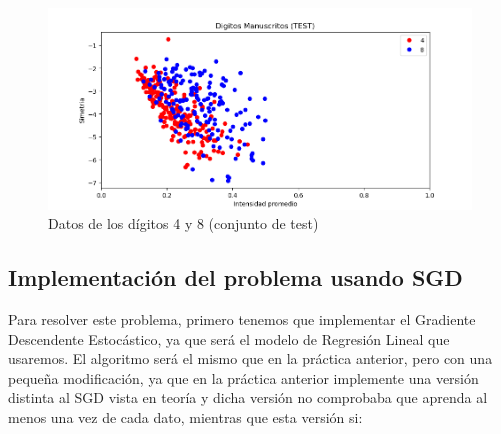 \documentclass[12pt, spanish]{article}
\begin{document}
\begin{figure}[H]
  \centering
      \includegraphics[scale = 0.70]{datos_bonus_test.png}
 		 \caption{Datos de los dígitos 4 y 8 (conjunto de test)}
  		\label{fig:bonus_test}

\end{figure}

\subsection{Implementación del problema usando SGD}

Para resolver este problema, primero tenemos que implementar el Gradiente Descendente Estocástico, ya que será el modelo de Regresión Lineal que usaremos. El algoritmo será el mismo que en la práctica anterior, pero con una pequeña modificación, ya que en la práctica anterior implemente una versión distinta al SGD vista en teoría y dicha versión no comprobaba que aprenda al menos una vez de cada dato, mientras que esta versión si:
\end{document}
